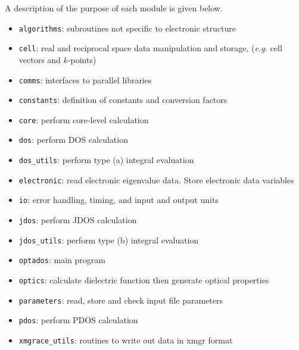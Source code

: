 \documentclass[a4paper,11pt,twoside]{book}
\begin{document}
{%
A description of the purpose of each module is given below.


\begin{itemize}
\item \texttt{algorithms}: subroutines not specific to electronic structure
\item \texttt{cell}: real and reciprocal space data manipulation and storage, (\emph{e.g.} cell vectors and $k$-points)
\item \texttt{comms}: interfaces to parallel libraries
\item \texttt{constants}: definition of constants and conversion factors
\item \texttt{core}: perform core-level calculation
\item \texttt{dos}: perform DOS calculation
\item \texttt{dos\_utils}: perform type (a) integral evaluation
\item \texttt{electronic}: read electronic eigenvalue data. Store electronic data variables
\item \texttt{io}: error handling, timing, and input and output units
\item \texttt{jdos}: perform JDOS calculation
\item \texttt{jdos\_utils}: perform type (b) integral evaluation
\item \texttt{optados}: main program
\item \texttt{optics}: calculate dielectric function then generate optical properties
\item \texttt{parameters}: read, store and check input file parameters
\item \texttt{pdos}: perform PDOS calculation
\item \texttt{xmgrace\_utils}: routines to write out data in xmgr format
\end{itemize}

}
\end{document}
